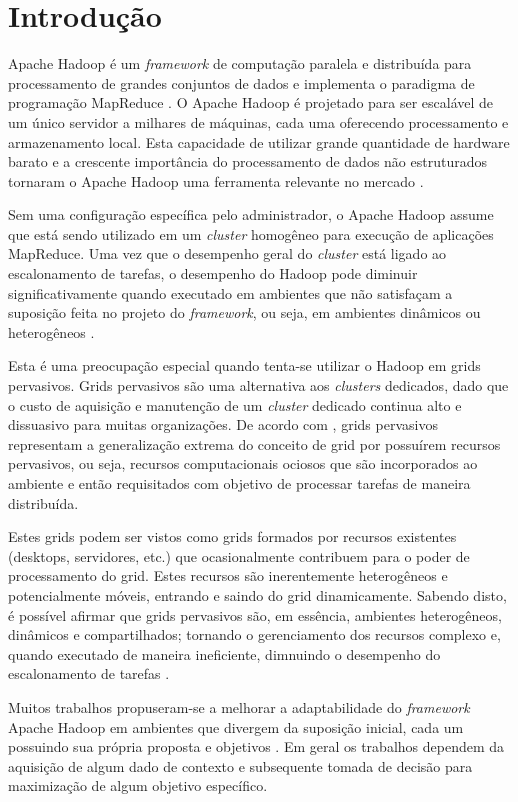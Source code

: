 \chapter{Introdução}
\label{chap:Intro}
Apache Hadoop é um \textit{framework} de computação paralela e distribuída para processamento de grandes conjuntos de dados e implementa o paradigma de programação \mbox{MapReduce} \cite{Dean2008}. O Apache Hadoop é projetado para ser escalável de um único servidor a milhares de máquinas, cada uma oferecendo processamento e armazenamento local. Esta capacidade de utilizar grande quantidade de hardware barato e a crescente importância do processamento de dados não estruturados tornaram o Apache Hadoop uma ferramenta relevante no mercado \cite{Su}.

Sem uma configuração específica pelo administrador, o Apache Hadoop assume que está sendo utilizado em um \textit{cluster} homogêneo para execução de aplicações \mbox{MapReduce}. Uma vez que o desempenho geral do \textit{cluster} está ligado ao escalonamento de tarefas, o desempenho do Hadoop pode diminuir significativamente quando executado em ambientes que não satisfaçam a suposição feita no projeto do \textit{framework}, ou seja, em ambientes dinâmicos ou heterogêneos \cite{Kumar2012}.

Esta é uma preocupação especial quando tenta-se utilizar o Hadoop em grids pervasivos. Grids pervasivos são uma alternativa aos \textit{clusters} dedicados, dado que o custo de aquisição e manutenção de um \textit{cluster} dedicado continua alto e dissuasivo para muitas organizações. De acordo com \cite{Parashar2010}, grids pervasivos representam a generalização  extrema do conceito de grid por possuírem recursos pervasivos, ou seja, recursos computacionais ociosos que são incorporados ao ambiente e então requisitados com objetivo de processar tarefas de maneira distribuída. 

Estes grids podem ser vistos como grids formados por recursos existentes (desktops, servidores, etc.) que ocasionalmente contribuem para o poder de processamento do grid. Estes recursos são inerentemente heterogêneos e potencialmente móveis, entrando e saindo do grid dinamicamente. Sabendo disto, é possível afirmar que grids pervasivos são, em essência, ambientes heterogêneos, dinâmicos e compartilhados; tornando o gerenciamento dos recursos complexo e, quando executado de maneira ineficiente, dimnuindo  o desempenho do escalonamento de tarefas \cite{Nascimento}.

Muitos trabalhos propuseram-se a melhorar a adaptabilidade do \textit{framework} Apache Hadoop em ambientes que divergem da suposição inicial, cada um possuindo sua própria proposta e objetivos \cite{Kumar2012, Zaharia2008, Rasooli2012, Sandholm2010, 3PGCIC}. Em geral os trabalhos dependem da aquisição de algum dado de contexto e subsequente tomada de decisão para maximização de algum objetivo específico.

